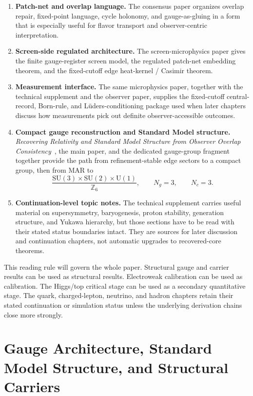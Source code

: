 \documentclass[11pt]{article}
\newcommand{\SU}{\mathrm{SU}}
\newcommand{\U}{\mathrm{U}}
\begin{document}
\begin{enumerate}[leftmargin=2em]
\item \textbf{Patch-net and overlap language.} The consensus paper organizes overlap repair,
fixed-point language, cycle holonomy, and gauge-as-gluing in a form that is especially useful
for flavor transport and observer-centric interpretation.
\item \textbf{Screen-side regulated architecture.} The screen-microphysics paper gives the
finite gauge-register screen model, the regulated patch-net embedding theorem, and the fixed-cutoff
edge heat-kernel / Casimir theorem.
\item \textbf{Measurement interface.} The same microphysics paper, together with the technical
supplement and the observer paper, supplies the fixed-cutoff central-record, Born-rule, and
L\"uders-conditioning package used when later chapters discuss how measurements pick out definite
observer-accessible outcomes.
\item \textbf{Compact gauge reconstruction and Standard Model structure.}
\emph{Recovering Relativity and Standard Model Structure from Observer Overlap Consistency}~\cite{ophcompact}, the
main paper, and the dedicated gauge-group fragment together provide the path from refinement-stable
edge sectors to a compact group, then from MAR to
\[
\frac{\SU(3)\times\SU(2)\times\U(1)}{\mathbb Z_6},
\qquad
N_g=3,
\qquad
N_c=3.
\]
\item \textbf{Continuation-level topic notes.} The technical supplement carries useful material
on supersymmetry, baryogenesis, proton stability, generation structure, and Yukawa hierarchy,
but those sections have to be read with their stated status boundaries intact. They are sources
for later discussion and continuation chapters, not automatic upgrades to recovered-core theorems.
\end{enumerate}

This reading rule will govern the whole paper. Structural gauge and carrier results can be used
as structural results. Electroweak calibration can be used as calibration. The
Higgs/top critical stage can be used as a secondary quantitative stage. The quark,
charged-lepton, neutrino, and hadron chapters retain their stated continuation or
simulation status unless the underlying derivation chains close more strongly.

\section{Gauge Architecture, Standard Model Structure, and Structural Carriers}
\end{document}
